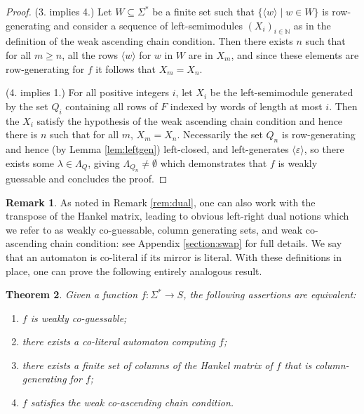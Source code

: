 \documentclass[10pt,a4paper]{amsart}
\newtheorem{thm}{Theorem}[section]
\theoremstyle{definition}
\newtheorem{rem}[thm]{Remark}
\numberwithin{equation}{section}
\numberwithin{theorem}{section}
\begin{document}
\begin{proof}
(3. implies 4.) Let $W \subseteq \Sigma^*$ be a finite set such that $\{\langle w \rangle \mid w \in W\}$ is row-generating and consider a sequence of left-semimodules $(X_i)_{i \in \mathbb{N}}$ as in the definition of the weak ascending chain condition. Then there exists $n$ such that for all $m \geq n$, all the rows $\langle w \rangle$ for $w$ in $W$ are in $X_m$, and since these elements are row-generating for $f$ it follows that $X_m = X_n$.
	
	
(4. implies 1.) For all positive integers $i$, let $X_i$ be the left-semimodule generated by the set $Q_i$ containing all rows of $F$ indexed by words of length at most $i$. Then the $X_i$ satisfy the hypothesis of the weak ascending chain condition and hence there is $n$ such that for all $m$, $X_m = X_n$. Necessarily the set $Q_n$ is row-generating and hence (by Lemma \ref{lem:leftgen}) left-closed, and left-generates $\langle \varepsilon \rangle$, so there exists some $\lambda \in \Lambda_Q$, giving $\Lambda_{Q_n} \neq \emptyset$ which demonstrates that $f$ is weakly guessable and concludes the proof.
\end{proof}

\begin{rem}
\label{rem:dual2}
As noted in Remark \ref{rem:dual}, one can also work with the transpose of the Hankel matrix, leading to obvious left-right dual notions which we refer to as weakly co-guessable, column generating sets, and weak co-ascending chain condition: see Appendix \ref{section:swap} for full details. We say that an automaton is co-literal if its mirror is literal. With these definitions in place, one can prove the following entirely analogous result.
\end{rem}

\begin{thm}
	\label{prop:coweakly}
	Given a function $f:\Sigma^* \to S$, the following assertions are equivalent:
	\begin{enumerate}
		\item $f$ is weakly co-guessable;
		\item there exists a co-literal automaton computing $f$;
		\item there exists a finite set of columns of the Hankel matrix of $f$ that is column-generating for $f$;
		\item $f$ satisfies the weak co-ascending chain condition.
	\end{enumerate}  
\end{thm}
\end{document}
